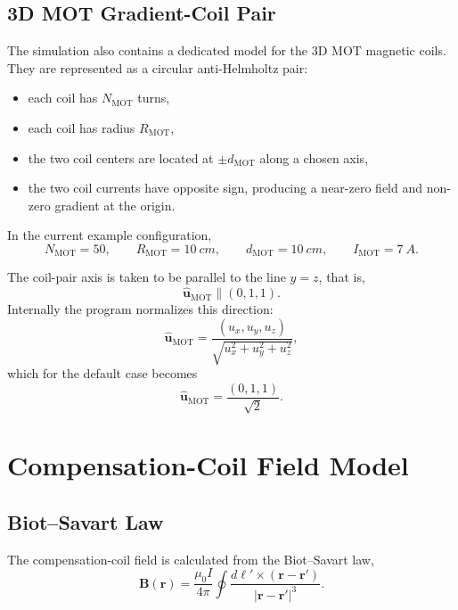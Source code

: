 \documentclass[12pt,a4paper]{article}
\begin{document}
\subsection{3D MOT Gradient-Coil Pair}

The simulation also contains a dedicated model for the 3D MOT magnetic coils. They are represented as a circular anti-Helmholtz pair:
\begin{itemize}
  \item each coil has $N_{\mathrm{MOT}}$ turns,
  \item each coil has radius $R_{\mathrm{MOT}}$,
  \item the two coil centers are located at $\pm d_{\mathrm{MOT}}$ along a chosen axis,
  \item the two coil currents have opposite sign, producing a near-zero field and non-zero gradient at the origin.
\end{itemize}

In the current example configuration,
\begin{equation}
  N_{\mathrm{MOT}} = 50,
  \qquad
  R_{\mathrm{MOT}} = \SI{10}{cm},
  \qquad
  d_{\mathrm{MOT}} = \SI{10}{cm},
  \qquad
  I_{\mathrm{MOT}} = \SI{7}{A}.
\end{equation}

The coil-pair axis is taken to be parallel to the line $y=z$, that is,
\begin{equation}
  \hat{\bm{u}}_{\mathrm{MOT}} \parallel (0,1,1).
\end{equation}
Internally the program normalizes this direction:
\begin{equation}
  \hat{\bm{u}}_{\mathrm{MOT}} =
  \frac{(u_x,u_y,u_z)}{\sqrt{u_x^2+u_y^2+u_z^2}},
\end{equation}
which for the default case becomes
\begin{equation}
  \hat{\bm{u}}_{\mathrm{MOT}} = \frac{(0,1,1)}{\sqrt{2}}.
\end{equation}

\section{Compensation-Coil Field Model}

\subsection{Biot--Savart Law}

The compensation-coil field is calculated from the Biot--Savart law,
\begin{equation}
  \bm{B}(\bm{r}) =
  \frac{\mu_0 I}{4\pi}
  \oint
  \frac{d\bm{\ell}' \times (\bm{r}-\bm{r}')}{|\bm{r}-\bm{r}'|^3}.
\end{equation}
\end{document}
